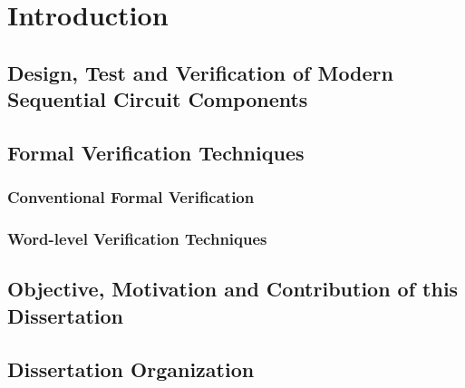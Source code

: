 \chapter{Introduction}
\label{ch:intro}
\section{Design, Test and Verification of Modern Sequential Circuit Components}

\section{Formal Verification Techniques}
\subsection{Conventional Formal Verification}
\subsection{Word-level Verification Techniques}

\section{Objective, Motivation and Contribution of this Dissertation}

\section{Dissertation Organization}